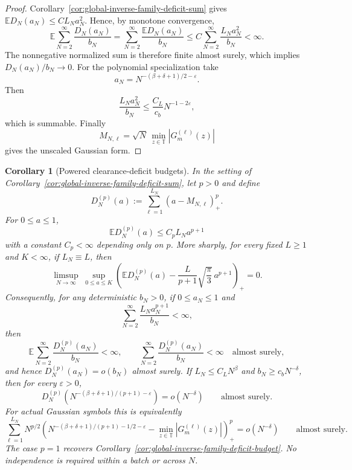 \documentclass[11pt]{amsart}
\numberwithin{equation}{section}
\newtheorem{corollary}[theorem]{Corollary}
\theoremstyle{definition}
\theoremstyle{remark}
\newcommand{\T}{\mathbb T}
\newcommand{\Exp}{\mathbb E}
\newcommand{\eps}{\varepsilon}
\begin{document}
\begin{proof}
Corollary~\ref{cor:global-inverse-family-deficit-sum} gives
\(\Exp D_N(a_N)\le CL_Na_N^2\).  Hence, by monotone convergence,
\[
  \Exp\sum_{N=2}^\infty \frac{D_N(a_N)}{b_N}
  =
  \sum_{N=2}^\infty \frac{\Exp D_N(a_N)}{b_N}
  \le
  C\sum_{N=2}^\infty \frac{L_Na_N^2}{b_N}
  <\infty .
\]
The nonnegative normalized sum is therefore finite almost surely, which implies
\(D_N(a_N)/b_N\to0\).  For the polynomial specialization take
\[
  a_N=N^{-(\beta+\delta+1)/2-\eps}.
\]
Then
\[
  \frac{L_Na_N^2}{b_N}
  \le \frac{C_L}{c_b}N^{-1-2\eps},
\]
which is summable.  Finally
\[
  M_{N,\ell}=\sqrt N\,\min_{z\in\T}|G_m^{(\ell)}(z)|
\]
gives the unscaled Gaussian form.
\end{proof}

\begin{corollary}[Powered clearance-deficit budgets]
\label{cor:global-inverse-family-deficit-powers}
In the setting of Corollary~\ref{cor:global-inverse-family-deficit-sum}, let
\(p>0\) and define
\[
  D_N^{(p)}(a):=
  \sum_{\ell=1}^{L_N}(a-M_{N,\ell})_+^p .
\]
For \(0\le a\le1\),
\[
  \Exp D_N^{(p)}(a)\le C_p L_Na^{p+1}
\]
with a constant \(C_p<\infty\) depending only on \(p\).  More sharply, for
every fixed \(L\ge1\) and \(K<\infty\), if \(L_N\equiv L\), then
\[
  \limsup_{N\to\infty}\;
  \sup_{0\le a\le K}
  \left(
    \Exp D_N^{(p)}(a)
    -\frac{L}{p+1}\sqrt{\frac{\pi}{3}}\,a^{p+1}
  \right)_+
  =0 .
\]
Consequently, for any deterministic \(b_N>0\), if \(0\le a_N\le1\) and
\[
  \sum_{N=2}^\infty \frac{L_Na_N^{p+1}}{b_N}<\infty,
\]
then
\[
  \Exp\sum_{N=2}^\infty \frac{D_N^{(p)}(a_N)}{b_N}<\infty,
  \qquad
  \sum_{N=2}^\infty \frac{D_N^{(p)}(a_N)}{b_N}<\infty
  \quad\text{almost surely},
\]
and hence \(D_N^{(p)}(a_N)=o(b_N)\) almost surely.  If
\(L_N\le C_LN^\beta\) and \(b_N\ge c_bN^{-\delta}\), then for every
\(\eps>0\),
\[
  D_N^{(p)}\!\left(N^{-(\beta+\delta+1)/(p+1)-\eps}\right)
  =o\!\left(N^{-\delta}\right)
  \qquad\text{almost surely}.
\]
For actual Gaussian symbols this is equivalently
\[
  \sum_{\ell=1}^{L_N}
  N^{p/2}\left(
    N^{-(\beta+\delta+1)/(p+1)-1/2-\eps}
    -\min_{z\in\T}|G_m^{(\ell)}(z)|
  \right)_+^p
  =
  o\!\left(N^{-\delta}\right)
  \qquad\text{almost surely}.
\]
The case \(p=1\) recovers Corollary~\ref{cor:global-inverse-family-deficit-budget}.
No independence is required within a batch or across \(N\).
\end{corollary}
\end{document}
